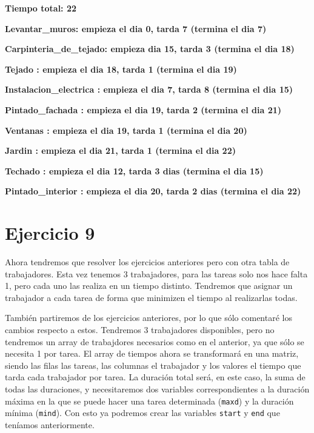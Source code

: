 \documentclass[11pt,a4paper]{article}
\begin{document}
\textbf{Tiempo total: 22} \vspace{-8px}

\textbf{Levantar\_muros: empieza el dia 0, tarda 7 (termina el dia 7)} \vspace{-8px}

\textbf{Carpinteria\_de\_tejado: empieza dia 15, tarda 3 (termina el dia 18)}\vspace{-8px}

\textbf{Tejado : empieza el dia 18, tarda 1 (termina el dia 19)} \vspace{-8px}

\textbf{Instalacion\_electrica : empieza el dia 7, tarda 8 (termina el dia 15)}\vspace{-8px}

\textbf{Pintado\_fachada : empieza el dia 19, tarda 2 (termina el dia 21)} \vspace{-8px}

\textbf{Ventanas : empieza el dia 19, tarda 1 (termina el dia 20)} \vspace{-8px}

\textbf{Jardin : empieza el dia 21, tarda 1 (termina el dia 22)} \vspace{-8px}

\textbf{Techado : empieza el dia 12, tarda 3 dias (termina el dia 15)} \vspace{-8px}

\textbf{Pintado\_interior : empieza el dia 20, tarda 2 dias (termina el dia 22)} \vspace{-8px}


\section*{Ejercicio 9}
Ahora tendremos que resolver los ejercicios anteriores pero con otra tabla de trabajadores. Esta vez tenemos 3 trabajadores, para las tareas
solo nos hace falta 1, pero cada uno las realiza en un tiempo distinto. Tendremos que asignar un trabajador a cada tarea de forma que minimizen
el tiempo al realizarlas todas.

También partiremos de los ejercicios anteriores, por lo que sólo comentaré los cambios respecto a estos. Tendremos 3 trabajadores disponibles,
pero no tendremos un array de trabajdores necesarios como en el anterior, ya que sólo se necesita 1 por tarea. El array de tiempos ahora se
transformará en una matriz, siendo las filas las tareas, las columnas el trabajador y los valores el tiempo que tarda cada trabajador por
tarea. La duración total será, en este caso, la suma de todas las duraciones, y necesitaremos dos variables correspondientes a la duración
máxima en la que se puede hacer una tarea determinada (\texttt{maxd}) y la duración mínima (\texttt{mind}). Con esto ya podremos crear las
variables \texttt{start} y \texttt{end} que teníamos anteriormente.
\end{document}
